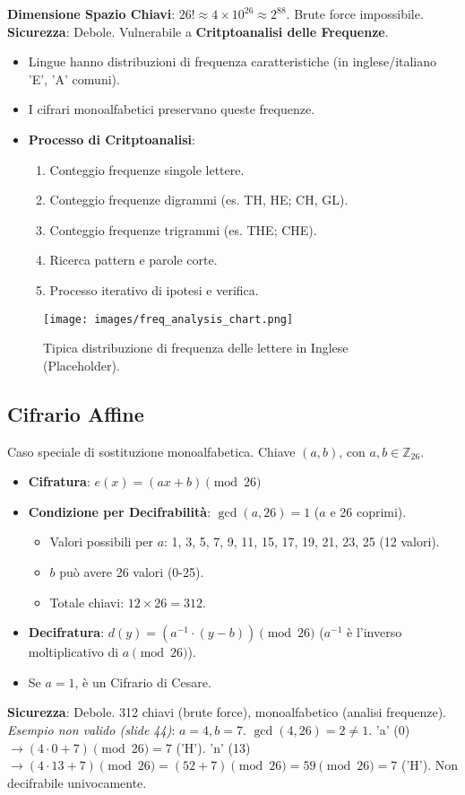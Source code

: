 \textbf{Dimensione Spazio Chiavi}: $26! \approx 4 \times 10^{26} \approx 2^{88}$. Brute force impossibile.
\textbf{Sicurezza}: Debole. Vulnerabile a \textbf{Critptoanalisi delle Frequenze}.
\begin{itemize}
    \item Lingue hanno distribuzioni di frequenza caratteristiche (in inglese/italiano 'E', 'A' comuni).
    \item I cifrari monoalfabetici preservano queste frequenze.
    \item \textbf{Processo di Critptoanalisi}:
    \begin{enumerate}
        \item Conteggio frequenze singole lettere.
        \item Conteggio frequenze digrammi (es. TH, HE; CH, GL).
        \item Conteggio frequenze trigrammi (es. THE; CHE).
        \item Ricerca pattern e parole corte.
        \item Processo iterativo di ipotesi e verifica.
    \end{enumerate}
\end{itemize}
\begin{figure}[H]
    \centering
    \texttt{[image: images/freq\_analysis\_chart.png]} %
    \caption{Tipica distribuzione di frequenza delle lettere in Inglese (Placeholder).}
    \label{fig:freq_analysis}
\end{figure}

\subsection{Cifrario Affine}
Caso speciale di sostituzione monoalfabetica. Chiave $(a, b)$, con $a, b \in \mathbb{Z}_{26}$.
\begin{itemize}
    \item \textbf{Cifratura}: $e(x) = (ax + b) \pmod{26}$
    \item \textbf{Condizione per Decifrabilità}: $\gcd(a, 26) = 1$ ($a$ e 26 coprimi).
        \begin{itemize}
            \item Valori possibili per $a$: 1, 3, 5, 7, 9, 11, 15, 17, 19, 21, 23, 25 (12 valori).
            \item $b$ può avere 26 valori (0-25).
            \item Totale chiavi: $12 \times 26 = 312$.
        \end{itemize}
    \item \textbf{Decifratura}: $d(y) = (a^{-1} \cdot (y - b)) \pmod{26}$ ($a^{-1}$ è l'inverso moltiplicativo di $a \pmod{26}$).
    \item Se $a=1$, è un Cifrario di Cesare.
\end{itemize}
\textbf{Sicurezza}: Debole. 312 chiavi (brute force), monoalfabetico (analisi frequenze).
\textit{Esempio non valido (slide 44)}: $a=4, b=7$. $\gcd(4, 26)=2 \neq 1$.
'a' (0) $\rightarrow (4 \cdot 0 + 7) \pmod{26} = 7$ ('H').
'n' (13) $\rightarrow (4 \cdot 13 + 7) \pmod{26} = (52+7) \pmod{26} = 59 \pmod{26} = 7$ ('H').
Non decifrabile univocamente.

